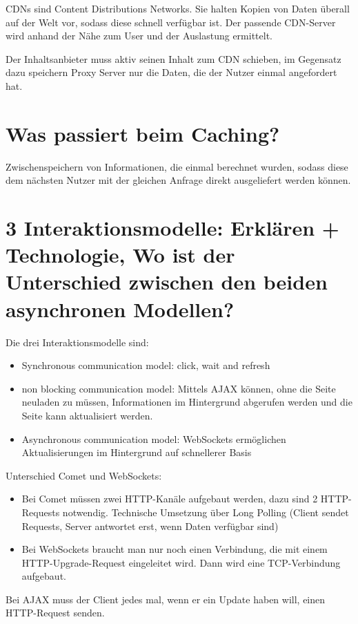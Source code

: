 \documentclass{article}
\begin{document}
	CDNs sind Content Distributions Networks. Sie halten Kopien von Daten überall auf der Welt vor, sodass diese schnell verfügbar ist. Der passende CDN-Server wird anhand der Nähe zum User und der Auslastung ermittelt.
	
	Der Inhaltsanbieter muss aktiv seinen Inhalt zum CDN schieben, im Gegensatz dazu speichern Proxy Server nur die Daten, die der Nutzer einmal angefordert hat.
	
	\section*{Was passiert beim Caching?}
	
	Zwischenspeichern von Informationen, die einmal berechnet wurden, sodass diese dem nächsten Nutzer mit der gleichen Anfrage direkt ausgeliefert werden können.
	
	\section*{3 Interaktionsmodelle: Erklären + Technologie, Wo ist der Unterschied zwischen den beiden asynchronen Modellen?}
	
	Die drei Interaktionsmodelle sind:
	\begin{itemize}
		\item Synchronous communication model: click, wait and refresh
		\item non blocking communication model: Mittels AJAX können, ohne die Seite neuladen zu müssen, Informationen im Hintergrund abgerufen werden und die Seite kann aktualisiert werden.
		\item Asynchronous communication model: WebSockets ermöglichen Aktualisierungen im Hintergrund auf schnellerer Basis
	\end{itemize}

	Unterschied Comet und WebSockets:
	\begin{itemize}
		\item Bei Comet müssen zwei HTTP-Kanäle aufgebaut werden, dazu sind 2 HTTP-Requests notwendig. Technische Umsetzung über Long Polling (Client sendet Requests, Server antwortet erst, wenn Daten verfügbar sind)
		\item Bei WebSockets braucht man nur noch einen Verbindung, die mit einem HTTP-Upgrade-Request eingeleitet wird. Dann wird eine TCP-Verbindung aufgebaut.
	\end{itemize}
	Bei AJAX muss der Client jedes mal, wenn er ein Update haben will, einen HTTP-Request senden.
	
\end{document}
